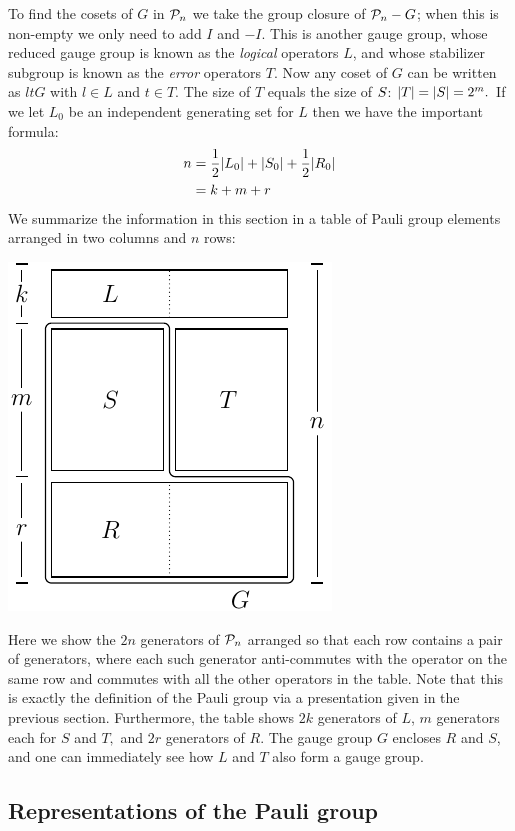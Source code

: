 To find the cosets of $G$ in $\mathcal{P}_n$ we take
the group closure of $\mathcal{P}_n-G$; when this is non-empty
we only need to add $I$ and $-I.$
This is another
gauge group, whose reduced gauge group is known as
the {\it logical} operators $L$, and whose 
stabilizer subgroup is known as the {\it error} operators $T.$
Now any coset of $G$ can be written as $ltG$ with
$l\in L$ and $t\in T.$
The size of $T$ equals the size of $S$: $|T|=|S|=2^m.$
If we let $L_0$ be an independent generating set for $L$
then we have the important formula:
\begin{align}
n &= \frac{1}{2}|L_0| + |S_0| + \frac{1}{2}|R_0|\\
  &= k + m + r
\end{align}
We summarize the information in this section in a table
of Pauli group elements arranged in
two columns and $n$ rows:
\begin{center}
\includegraphics[]{pic-canonical.pdf}
\end{center}
Here we show the $2n$ generators of $\mathcal{P}_n$ arranged 
so that each row contains a pair of generators,
where each such generator anti-commutes with the operator on the same row and
commutes with all the other operators in the table.
Note that this is exactly the definition of the Pauli group
via a presentation given in the previous section.
Furthermore, the table shows $2k$ generators
of $L$, $m$ generators each for $S$ and $T,$ and $2r$
generators of $R.$
The gauge group $G$ encloses $R$ and $S$, and one can
immediately see how $L$ and $T$ also form a gauge group.


\subsection{Representations of the Pauli group}

